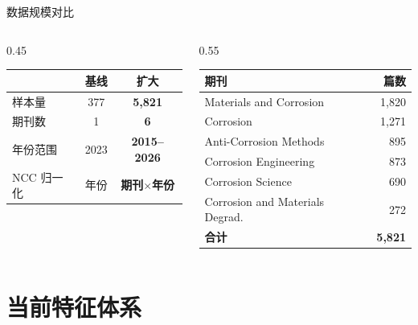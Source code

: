 \documentclass[10pt,aspectratio=169]{ctexbeamer}
\begin{document}
\begin{frame}{数据规模对比}
  \begin{columns}[T]
    \begin{column}{0.45\textwidth}
      \centering
      \begin{tabular}{lcc}
        \hline
        & 基线 & 扩大 \\
        \hline
        样本量     & 377      & \textbf{5{,}821} \\
        期刊数     & 1        & \textbf{6} \\
        年份范围   & 2023     & \textbf{2015--2026} \\
        NCC 归一化 & 年份     & \textbf{期刊$\times$年份} \\
        \hline
      \end{tabular}
    \end{column}
    \begin{column}{0.55\textwidth}
      \footnotesize
      \centering
      \begin{tabular}{lr}
        \hline
        期刊 & 篇数 \\
        \hline
        Materials and Corrosion          & 1{,}820 \\
        Corrosion                        & 1{,}271 \\
        Anti-Corrosion Methods           & 895 \\
        Corrosion Engineering            & 873 \\
        Corrosion Science                & 690 \\
        Corrosion and Materials Degrad.  & 272 \\
        \hline
        \textbf{合计}                    & \textbf{5{,}821} \\
        \hline
      \end{tabular}
    \end{column}
  \end{columns}
\end{frame}

\section{当前特征体系}
\end{document}
